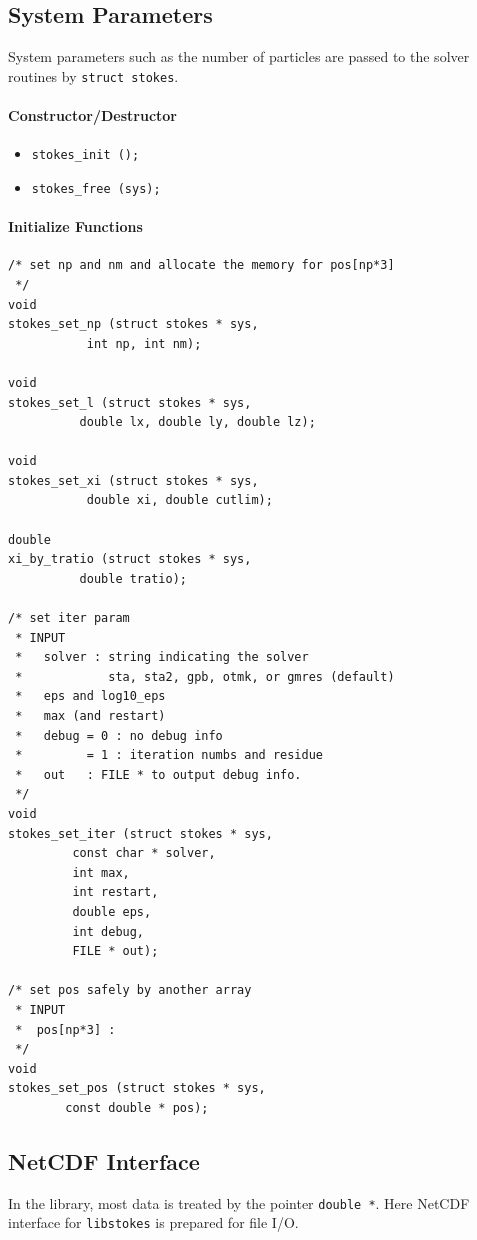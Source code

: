 \documentclass{book}
\begin{document}
\subsection{System Parameters}
System parameters such as the number of particles
are passed to the solver routines by {\tt struct stokes}.

\paragraph{Constructor/Destructor}
\begin{itemize}
\item {\tt stokes\_init ();}
\item {\tt stokes\_free (sys);}
\end{itemize}


\paragraph{Initialize Functions}
\begin{verbatim}
/* set np and nm and allocate the memory for pos[np*3]
 */
void
stokes_set_np (struct stokes * sys,
	       int np, int nm);

void
stokes_set_l (struct stokes * sys,
	      double lx, double ly, double lz);

void
stokes_set_xi (struct stokes * sys,
	       double xi, double cutlim);

double
xi_by_tratio (struct stokes * sys,
	      double tratio);

/* set iter param
 * INPUT
 *   solver : string indicating the solver
 *            sta, sta2, gpb, otmk, or gmres (default)
 *   eps and log10_eps
 *   max (and restart)
 *   debug = 0 : no debug info
 *         = 1 : iteration numbs and residue
 *   out   : FILE * to output debug info.
 */
void
stokes_set_iter (struct stokes * sys,
		 const char * solver,
		 int max,
		 int restart,
		 double eps,
		 int debug,
		 FILE * out);

/* set pos safely by another array
 * INPUT
 *  pos[np*3] :
 */
void
stokes_set_pos (struct stokes * sys,
		const double * pos);
\end{verbatim}

\subsection{NetCDF Interface}
In the library, most data is treated by the pointer
{\tt double *}. Here NetCDF interface for {\tt libstokes}
is prepared for file I/O.
\end{document}
